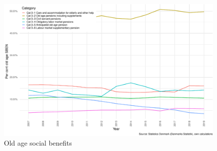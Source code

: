 \documentclass[
]{book}
\begin{document}
\begin{figure}
\centering
\includegraphics{figures/old-age-public-spend-1.pdf}
\caption{\label{fig:old-age-public-spend}Old age social benefits}
\end{figure}
\end{document}
